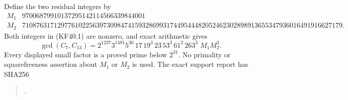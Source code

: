 Define the two residual integers by
{\scriptsize
\[
\begin{array}{c|r}
 M_1&97006879910137295142114566339844001\\
 M_2&7108763171297761022563973098474159328699317449544482052462302898913655347936016491916627179.
\end{array}                                                \tag{KF40.2}
\]
}
Both integers in (KF40.1) are nonzero, and exact arithmetic gives
\[
 \gcd(C_7,C_{13})=
 2^{1237}3^{1481}5^{30}\,17\,19^3\,23\,53^3\,61^2\,263^3
                                      \;M_1M_2^3.          \tag{KF40.3}
\]
Every displayed small factor is a proved prime below $2^{31}$.
No primality or squarefreeness assertion about $M_1$ or $M_2$
is used.  The exact support report has SHA256
\begin{quote}\small
{}.
\end{quote}

